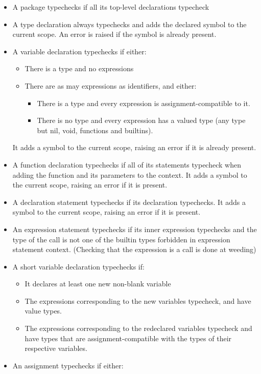 \documentclass[letterpaper,11pt]{article}
\begin{document}
\begin{itemize}
\item A package typechecks if all its top-level declarations typecheck
\item A type declaration always typechecks and adds the declared symbol to the current scope. An error is raised if the symbol is already present.
\item A variable declaration typechecks if either:
	\begin{itemize}
	\item There is a type and no expressions
	\item There are as may expressions as identifiers, and either:
		\begin{itemize}
		\item There is a type and every expression is assignment-compatible to it.
		\item There is no type and every expression has a valued type (any type but nil, void, functions and builtins).
		\end{itemize}
	\end{itemize}
	It adds a symbol to the current scope, raising an error if it is already present.
\item A function declaration typechecks if all of its statements typecheck when adding the function and its parameters to the context. It adds a symbol to the current scope, raising an error if it is present.
\item A declaration statement typechecks if its declaration typechecks. It adds a symbol to the current scope, raising an error if it is present.
\item An expression statement typechecks if its inner expression typechecks and the type of the call is not one of the builtin types forbidden in expression statement context. (Checking that the expression is a call is done at weeding)
\item A short variable declaration typechecks if:
	\begin{itemize}
	\item It declares at least one new non-blank variable
	\item The expressions corresponding to the new variables typecheck, and have value types.
	\item The expressions corresponding to the redeclared variables typecheck and have types that are assignment-compatible with the types of their respective variables.
	\end{itemize}
\item An assignment typechecks if either:

\end{itemize}
\end{document}
